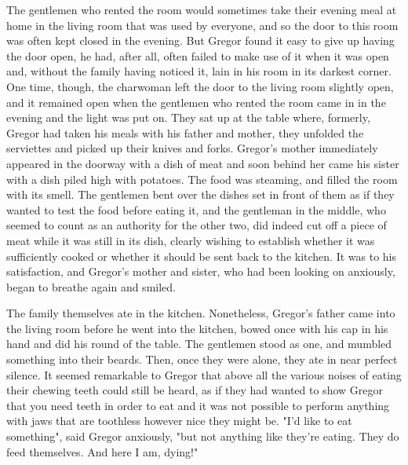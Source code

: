 \documentclass[12pt]{book}
\begin{document}
    The gentlemen who rented the room would sometimes take their evening meal at home in the living room that was used by everyone, and so the door to this room was often kept closed in the evening. But Gregor found it easy to give up having the door open, he had, after all, often failed to make use of it when it was open and, without the family having noticed it, lain in his room in its darkest corner. One time, though, the charwoman left the door to the living room slightly open, and it remained open when the gentlemen who rented the room came in in the evening and the light was put on. They sat up at the table where, formerly, Gregor had taken his meals with his father and mother, they unfolded the serviettes and picked up their knives and forks. Gregor's mother immediately appeared in the doorway with a dish of meat and soon behind her came his sister with a dish piled high with potatoes. The food was steaming, and filled the room with its smell. The gentlemen bent over the dishes set in front of them as if they wanted to test the food before eating it, and the gentleman in the middle, who seemed to count as an authority for the other two, did indeed cut off a piece of meat while it was still in its dish, clearly wishing to establish whether it was sufficiently cooked or whether it should be sent back to the kitchen. It was to his satisfaction, and Gregor's mother and sister, who had been looking on anxiously, began to breathe again and smiled.

    The family themselves ate in the kitchen. Nonetheless, Gregor's father came into the living room before he went into the kitchen, bowed once with his cap in his hand and did his round of the table. The gentlemen stood as one, and mumbled something into their beards. Then, once they were alone, they ate in near perfect silence. It seemed remarkable to Gregor that above all the various noises of eating their chewing teeth could still be heard, as if they had wanted to show Gregor that you need teeth in order to eat and it was not possible to perform anything with jaws that are toothless however nice they might be. "I'd like to eat something", said Gregor anxiously, "but not anything like they're eating. They do feed themselves. And here I am, dying!"
\end{document}
